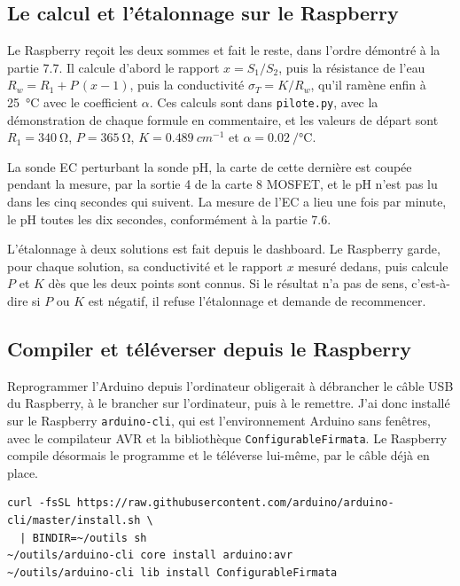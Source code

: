 \subsection{Le calcul et l'étalonnage sur le Raspberry}

Le Raspberry reçoit les deux sommes et fait le reste, dans l'ordre démontré à la partie 7.7. Il calcule d'abord le rapport $x = S_1/S_2$, puis la résistance de l'eau $R_w = R_1 + P\,(x-1)$, puis la conductivité $\sigma_T = K/R_w$, qu'il ramène enfin à \qty{25}{\celsius} avec le coefficient $\alpha$. Ces calculs sont dans \texttt{pilote.py}, avec la démonstration de chaque formule en commentaire, et les valeurs de départ sont $R_1 = \qty{340}{\ohm}$, $P = \qty{365}{\ohm}$, $K = \qty{0,489}{cm^{-1}}$ et $\alpha = \qty{0,02}{\per\celsius}$.

La sonde EC perturbant la sonde pH, la carte de cette dernière est coupée pendant la mesure, par la sortie 4 de la carte 8 MOSFET, et le pH n'est pas lu dans les cinq secondes qui suivent. La mesure de l'EC a lieu une fois par minute, le pH toutes les dix secondes, conformément à la partie 7.6.

L'étalonnage à deux solutions est fait depuis le dashboard. Le Raspberry garde, pour chaque solution, sa conductivité et le rapport $x$ mesuré dedans, puis calcule $P$ et $K$ dès que les deux points sont connus. Si le résultat n'a pas de sens, c'est-à-dire si $P$ ou $K$ est négatif, il refuse l'étalonnage et demande de recommencer.

\subsection{Compiler et téléverser depuis le Raspberry}

Reprogrammer l'Arduino depuis l'ordinateur obligerait à débrancher le câble USB du Raspberry, à le brancher sur l'ordinateur, puis à le remettre. J'ai donc installé sur le Raspberry \texttt{arduino-cli}, qui est l'environnement Arduino sans fenêtres, avec le compilateur AVR et la bibliothèque \texttt{ConfigurableFirmata}. Le Raspberry compile désormais le programme et le téléverse lui-même, par le câble déjà en place.

\begin{verbatim}
curl -fsSL https://raw.githubusercontent.com/arduino/arduino-cli/master/install.sh \
  | BINDIR=~/outils sh
~/outils/arduino-cli core install arduino:avr
~/outils/arduino-cli lib install ConfigurableFirmata
\end{verbatim}

